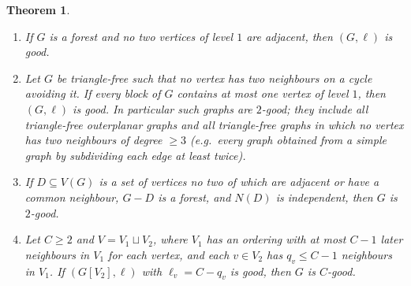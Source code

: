 \documentclass[11pt,letterpaper]{article}
\newtheorem{theorem}{Theorem}[section]
\theoremstyle{definition}
\begin{document}
\begin{theorem}\label{thm:leveled}
\begin{enumerate}[label=(\alph*),itemsep=0pt]
\item If $G$ is a forest and no two vertices of level $1$ are adjacent, then $(G,\ell)$ is good.
\item Let $G$ be triangle-free such that no vertex has two neighbours on a cycle avoiding it. If
every block of $G$ contains at most one vertex of level $1$, then $(G,\ell)$ is good. In particular
such graphs are $2$-good; they include all triangle-free outerplanar graphs and all triangle-free
graphs in which no vertex has two neighbours of degree $\ge3$ (e.g.\ every graph obtained from a
simple graph by subdividing each edge at least twice).
\item If $D\subseteq V(G)$ is a set of vertices no two of which are adjacent or have a common
neighbour, $G-D$ is a forest, and $N(D)$ is independent, then $G$ is $2$-good.
\item Let $C\ge2$ and $V=V_1\sqcup V_2$, where $V_1$ has an ordering with at most $C-1$ later
neighbours in $V_1$ for each vertex, and each $v\in V_2$ has $q_v\le C-1$ neighbours in $V_1$. If
$(G[V_2],\ell)$ with $\ell_v=C-q_v$ is good, then $G$ is $C$-good.
\end{enumerate}
\end{theorem}
\end{document}
